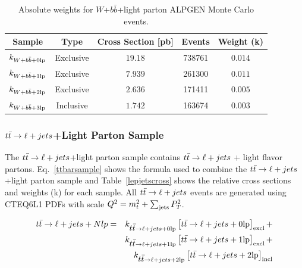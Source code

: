 \begin{table}[!h!tbp]
\begin{center}
\caption{Absolute weights for $W$+$b\bar{b}$+light parton ALPGEN Monte Carlo events.}
\label{wbbcross}
\begin{tabular}{c|cccc}
Sample					&	Type		&	Cross Section [pb]	&	Events	&	Weight (k) \\
\hline
$k_{W+b\bar{b}+0\rm{lp}}$	&	Exclusive	&	$19.18$			&	738761	&	$0.014$			\\
$k_{W+b\bar{b}+1\rm{lp}}$	&	Exclusive	&	$7.939$			&	261300	&	$0.011$			\\
$k_{W+b\bar{b}+2\rm{lp}}$	&	Exclusive	&	$2.636$			&	171411	&	$0.005$	\\
$k_{W+b\bar{b}+3\rm{lp}}$	&	Inclusive	&	$1.742$			&	163674	&	$0.003$	\\
\end{tabular}
\vspace{-0.1 in}
\end{center}
\end{table}



\subsubsection{$\mbox{$t\bar{t}$} \rightarrow \ell + jets$+Light Parton Sample}

The $\mbox{$t\bar{t}$} \rightarrow \ell + jets$+light parton sample contains $\mbox{$t\bar{t}$} \rightarrow \ell + jets$ + light flavor partons. Eq.~\ref{ttbarsample} shows the formula used to combine the $\mbox{$t\bar{t}$} \rightarrow \ell + jets$+light parton sample and Table~\ref{lepjetscross} shows the relative cross sections and weights (k) for each sample. All $\mbox{$t\bar{t}$} \rightarrow \ell + jets$ events are generated using CTEQ6L1 PDFs with scale $Q^{2}=m_{t}^{2} + \sum_{\rm{jets}}P^{2}_{T}$.

\begin{eqnarray}
\label{ttbarsample}
\nonumber
\mbox{$t\bar{t}$} \rightarrow \ell + jets+Nlp&=& k_{\mbox{$t\bar{t}$} \rightarrow \ell + jets+0\rm{lp}} \left[\mbox{$t\bar{t}$} \rightarrow \ell + jets+0\rm{lp}\right]_{\rm{excl}} +\\
\nonumber
& & k_{\mbox{$t\bar{t}$} \rightarrow \ell + jets+1\rm{lp}} \left[\mbox{$t\bar{t}$} \rightarrow \ell + jets+1\rm{lp}\right]_{\rm{excl}} + \\
& & k_{\mbox{$t\bar{t}$} \rightarrow \ell + jets+2\rm{lp}} \left[\mbox{$t\bar{t}$} \rightarrow \ell + jets+2\rm{lp}\right]_{\rm{incl}} 
\end{eqnarray}


